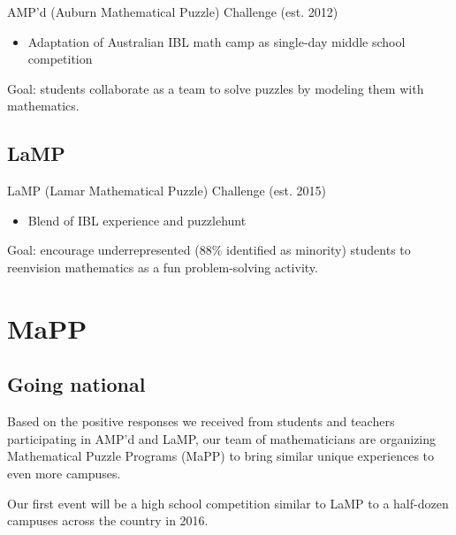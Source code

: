 \documentclass{beamer}
\newcommand{\vpause}{\pause\vspace{1em}}
\begin{document}
\begin{frame}
  AMP'd (Auburn Mathematical Puzzle) Challenge (est. 2012)
  \begin{itemize}
    \item Adaptation of Australian IBL math camp
          as single-day middle school competition
  \end{itemize}

  \vpause

  Goal: students collaborate as a team to solve puzzles by modeling them
  with mathematics.
\end{frame}

\subsection{LaMP}

\begin{frame}
  LaMP (Lamar Mathematical Puzzle) Challenge (est. 2015)
  \begin{itemize}
    \item Blend of IBL experience and puzzlehunt
  \end{itemize}

  \vpause

  Goal: encourage underrepresented (88\% identified as minority)
  students to reenvision mathematics as a fun problem-solving
  activity.
\end{frame}

\section{MaPP}

\subsection{Going national}

\begin{frame}
  Based on the positive responses we received from students and
  teachers participating in AMP'd and LaMP, our team of mathematicians
  are organizing Mathematical Puzzle Programs (MaPP) to bring similar
  unique experiences to even more campuses.

  \vpause

  Our first event will be a high school competition similar to LaMP
  to a half-dozen campuses across the country in 2016.
\end{frame}
\end{document}
